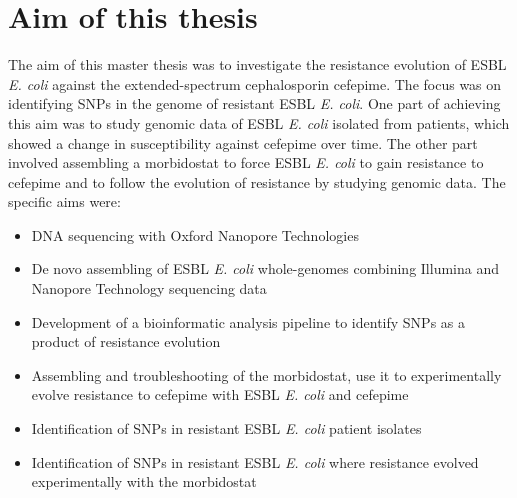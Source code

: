 \chapter{Aim of this thesis}
The aim of this master thesis was to investigate the resistance evolution of ESBL \textit{E. coli} against the extended-spectrum cephalosporin cefepime. The focus was on identifying  SNPs in the genome of resistant ESBL \textit{E. coli}. One part of achieving this aim was to study genomic data of ESBL \textit{E. coli} isolated from patients, which showed a change in susceptibility against cefepime over time. The other part involved assembling a morbidostat to force ESBL \textit{E. coli} to gain resistance to cefepime and to follow the evolution of resistance by studying genomic data. The specific aims were:
\begin{itemize}
	\item DNA sequencing with Oxford Nanopore Technologies
	\item De novo assembling of ESBL \textit{E. coli} whole-genomes combining Illumina and Nanopore Technology sequencing data
	\item Development of a bioinformatic analysis pipeline to identify SNPs as a product of resistance evolution
	\item Assembling and troubleshooting of the morbidostat, use it to experimentally evolve resistance to cefepime with ESBL \textit{E. coli} and cefepime
	 
	\item Identification of SNPs in resistant ESBL \textit{E. coli} patient isolates
	\item Identification of SNPs in resistant ESBL \textit{E. coli} where resistance evolved experimentally with the morbidostat
\end{itemize}  